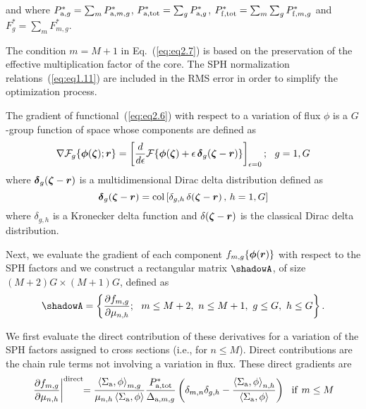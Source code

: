\noindent and where $P^*_{{\rm a},g}=\sum_m P^*_{{\rm a},m,g}$, $P^*_{{\rm a},{\rm tot}}=\sum_g P^*_{{\rm a},g}$, $P^*_{{\rm f},{\rm tot}}=\sum_m \sum_g P^*_{{\rm f},m,g}$ and $F^*_g=\sum_m F^*_{m,g}$.

\vskip 0.08cm

The condition $m=M+1$ in 
Eq.~(\ref{eq:eq2.7}) is based on the preservation of the effective multiplication factor of the core. The SPH normalization relations~(\ref{eq:eq1.11}) are
included in the RMS error in order to simplify the optimization process.

\vskip 0.08cm

The gradient of functional~(\ref{eq:eq2.6}) with respect to a variation of flux $\phi$ is a $G$-group function of space whose components are defined as
\begin{equation}
\nabla {\cal F}_g\{\bff(\phi)(\bff(\zeta));\bff(r)\}=\left[ {d\over d\epsilon}{\cal F}\{\bff(\phi)(\bff(\zeta))+\epsilon \, \bff(\delta)_g(\bff(\zeta)-\bff(r))\}\right]_{\epsilon=0} ; \ \ g=1,G
\label{eq:eq2.7a}
\end{equation}
\noindent where $\bff(\delta)_g(\bff(\zeta)-\bff(r))$ is a multidimensional Dirac delta distribution defined as
\begin{equation}
\bff(\delta)_g(\bff(\zeta)-\bff(r))={\rm col} \left[\delta_{g,h} \, \delta(\bff(\zeta)-\bff(r)) \, , \, h=1,G \right]
\label{eq:eq2.7b}
\end{equation}
\noindent where $\delta_{g,h}$ is a Kronecker delta function and $\delta(\bff(\zeta)-\bff(r))$ is the classical Dirac delta distribution.

\vskip 0.08cm
Next, we evaluate the gradient of each component $f_{m,g}\{\bff(\phi)(\bff(r))\}$ with respect to the SPH factors and we construct a rectangular matrix $\shadowA$, of size $(M+2)G\times (M+1)G$, defined as
\begin{equation}
\shadowA=\left\{ {\partial f_{m,g}\over \partial \mu_{n,h}}  ; \ \ m\le M+2, \ n \le M+1, \ g\le G, \ h\le G \right\} .
\label{eq:eq2.8}
\end{equation}

\vskip 0.08cm

We first evaluate the direct contribution of these derivatives for a variation of the SPH factors assigned to cross sections (i.e., for $n\le M$). Direct contributions are the chain rule terms not involving a variation in flux. These direct
gradients are
\begin{equation}
\left.{\partial f_{m,g}\over \partial \mu_{n,h}}\right|^{\rm direct} \negthinspace\negthinspace ={\left< \Sigma_{\rm a} , \phi \right>_{m,g}\over \mu_{n,h} \left< \Sigma_{\rm a} , \phi \right>} {P^*_{{\rm a},{\rm tot}}\over \Delta_{{\rm a},m,g} } \left( \delta_{m,n}\delta_{g,h}-{\left< \Sigma_{\rm a} , \phi \right>_{n,h}\over \left< \Sigma_{\rm a} , \phi \right>} \right) \ \ {\rm if} \ m\le M
\label{eq:eq2.9}
\end{equation}

